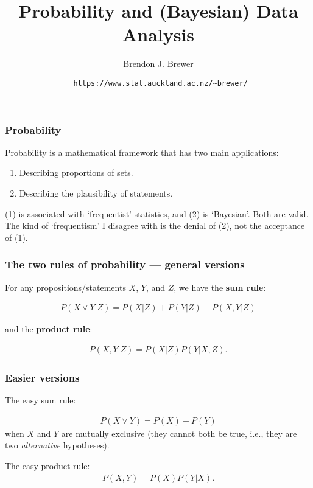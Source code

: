 \documentclass{beamer}
\title{Probability and (Bayesian) Data Analysis}
\author{Brendon J. Brewer}
\institute{Department of Statistics\\
The University of Auckland}
\date{{\tt \color{blue} https://www.stat.auckland.ac.nz/\~{ }brewer/}}
\begin{document}
\frame{\titlepage}


\begin{frame}
\frametitle{Probability}

Probability is a mathematical framework that has two main applications:
\vspace{0.5em}
\begin{enumerate}
  \item[(1)] Describing proportions of sets.
  \item[(2)] Describing the plausibility of statements.
\end{enumerate}
\vspace{1em}
(1) is associated with `frequentist' statistics, and (2) is `Bayesian'.
Both are valid. The kind of `frequentism' I disagree with is the denial
of (2), not the acceptance of (1).

\end{frame}


\begin{frame}
\frametitle{The two rules of probability --- general versions}
For any propositions/statements $X$, $Y$, and $Z$, we have
the {\bf sum rule}:

\begin{align}
P(X \vee Y | Z) = P(X | Z) + P(Y | Z) - P(X, Y | Z)
\end{align}

and the {\bf product rule}:

\begin{align}
P(X, Y | Z) = P(X | Z)P(Y | X, Z).
\end{align}

\end{frame}


\begin{frame}
\frametitle{Easier versions}
The easy sum rule:

\begin{align}
P(X \vee Y) = P(X) + P(Y)
\end{align}
when $X$ and $Y$ are mutually exclusive (they cannot both be true, i.e.,
they are two {\em alternative} hypotheses).

The easy product rule:
\begin{align}
P(X, Y) = P(X)P(Y | X).
\end{align}

\end{frame}
\end{document}
